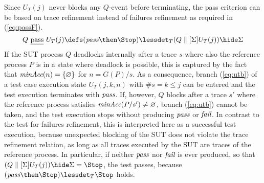 Since
$U_T(j)$ never blocks any $Q$-event before terminating, the pass criterion
can be based on trace refinement instead of failures refinement as required
in (\ref{eq:passF}).
%
\begin{equation}
\label{eq:passT}
Q\ \pass\ U_T(j) \defs (\epass\then\Stop) \lessdet_T (Q\parallel[\Sigma] U_T(j)) \hide \Sigma
\end{equation}
%
If the SUT process $Q$ deadlocks internally after a trace $s$ where also the reference
process $P$ is in a state where deadlock is possible, this is captured by the fact
that $\text{\it minAcc}(n) = \{ \varnothing\}$ for $n = G(P)/s$. As a consequence, branch
(\ref{eq:utb}) of a test case execution state $U_T(j,k,n)$  
with $\#s = k \le j$   can be entered
and the  test execution terminates with ${\text{\it pass}}$. If, however,  
$Q$ blocks after a trace $s'$
where the reference process satisfies $\text{\it minAcc}(P/s') \neq\varnothing$, branch 
(\ref{eq:utb})  cannot be taken, and the test execution stops without producing
${\text{\it pass}}$ or ${\text{\it fail}}$. In contrast to the test for failures refinement, this is   interpreted here as a successful test execution, because unexpected blocking
of the SUT does not violate the trace refinement relation, as long as all traces 
executed by the SUT are traces of the reference process. In particular, if 
neither ${\text{\it pass}}$ nor ${\text{\it fail}}$ is ever produced, so that
$(Q\parallel[\Sigma] U_T(j)) \hide \Sigma = \Stop$, the test passes, because
$(\epass\then\Stop) \lessdet_T \Stop$ holds.



